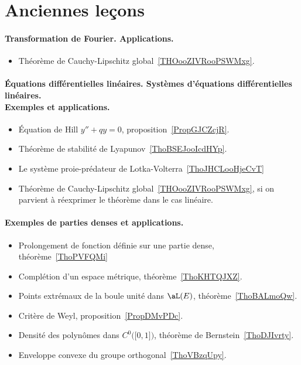 \section{Anciennes leçons}

\paragraph{Transformation de Fourier. Applications.}
\begin{itemize}
	\item Théorème de Cauchy-Lipschitz global~\ref{THOooZIVRooPSWMxg}.
\end{itemize}
\paragraph{Équations différentielles linéaires. Systèmes d’équations différentielles linéaires.\\ Exemples et applications.}
\begin{itemize}
	\item Équation de Hill \( y''+qy=0\), proposition~\ref{PropGJCZcjR}.
	\item Théorème de stabilité de Lyapunov~\ref{ThoBSEJooIcdHYp}.
	\item Le système proie-prédateur de Lotka-Volterra~\ref{ThoJHCLooHjeCvT}
	\item Théorème de Cauchy-Lipschitz global~\ref{THOooZIVRooPSWMxg}, si on parvient à réexprimer le théorème dans le cas linéaire.
\end{itemize}
\paragraph{Exemples de parties denses et applications.}
\begin{itemize}
	\item Prolongement de fonction définie sur une partie dense, théorème~\ref{ThoPVFQMi}
	\item Complétion d'un espace métrique, théorème~\ref{ThoKHTQJXZ}.
	\item Points extrémaux de la boule unité dans \( \aL(E)\), théorème~\ref{ThoBALmoQw}.
	\item Critère de Weyl, proposition~\ref{PropDMvPDc}.
	\item Densité des polynômes dans \( C^0\big( \mathopen[ 0 , 1 \mathclose] \big)\), théorème de Bernstein~\ref{ThoDJIvrty}.
	\item Enveloppe convexe du groupe orthogonal~\ref{ThoVBzqUpy}.
\end{itemize}
